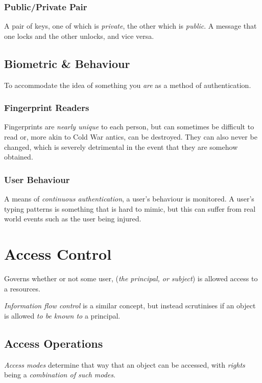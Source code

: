 \documentclass{article}
\begin{document}
\subsubsection{Public/Private Pair}

A pair of keys, one of which is \textit{private}, the other which is \textit{public}. A message that one locks and the other unlocks, and vice versa.

\subsection{Biometric \& Behaviour}

To accommodate the idea of something you \textit{are} as a method of authentication.

\subsubsection{Fingerprint Readers}

Fingerprints are \textit{nearly unique} to each person, but can sometimes be difficult to read or, more akin to Cold War antics, can be destroyed. They can also never be changed, which is severely detrimental in the event that they are somehow obtained.

\subsubsection{User Behaviour}

A means of \textit{continuous authentication}, a user's behaviour is monitored. A user's typing patterns is something that is hard to mimic, but this can suffer from real world events such as the user being injured.

\section{Access Control}

Governs whether or not some user, (\textit{the principal, or subject}) is allowed access to a resources.

\textit{Information flow control} is a similar concept, but instead scrutinises if an object is allowed \textit{to be known to} a principal.

\subsection{Access Operations}

\textit{Access modes} determine that way that an object can be accessed, with \textit{rights} being a\textit{ combination of such modes}.
\end{document}

